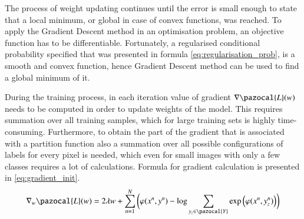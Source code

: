 The process of weight updating continues until the error is small enough to state that a local minimum, or global in case of convex functions, was reached. To apply the Gradient Descent method in an optimisation problem, an objective function has to be differentiable. Fortunately, a regularised conditional probability specified that was presented in formula \ref{eq:regularisation_prob}, is a smooth and convex function, hence Gradient Descent method can be used to find a global minimum of it.

During the training process, in each iteration value of gradient $\nabla \pazocal{L}(w)$ needs to be computed in order to update weights of the model. This requires summation over all training samples, which for large training sets is highly time-consuming. Furthermore, to obtain the part of the gradient that is associated with a partition function also a summation over all possible configurations of labels for every pixel is needed, which even for small images with only a few classes requires a lot of calculations. Formula for gradient calculation is presented in \ref{eq:gradient_init}.
\begin{equation}
    \label{eq:gradient_init}
    \nabla_w\pazocal{L}(w) = 2\lambda w + 
    \sum_{n=1}^{N}{ \bigg( \varphi(x^n,y^n) -
    \log{\sum_{y_z \in \pazocal{Y}}{\exp \Big( \varphi(x^n,y_{z}^{n}) \Big) }} \bigg)}
\end{equation}

